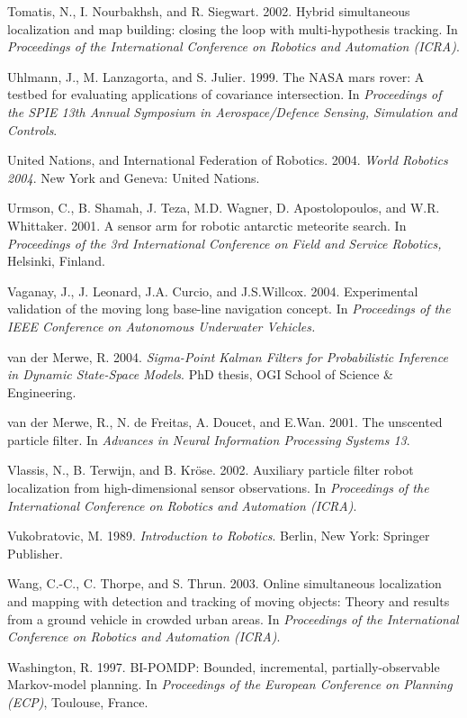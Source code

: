 \documentclass[10pt,a4paper]{article}
\begin{document}
Tomatis, N., I. Nourbakhsh, and R. Siegwart. 2002. Hybrid simultaneous localization
and map building: closing the loop with multi-hypothesis tracking. In \textit{Proceedings
of the International Conference on Robotics and Automation (ICRA)}.

Uhlmann, J., M. Lanzagorta, and S. Julier. 1999. The NASA mars rover: A testbed for
evaluating applications of covariance intersection. In \textit{Proceedings of the SPIE 13th
Annual Symposium in Aerospace/Defence Sensing, Simulation and Controls}.

United Nations, and International Federation of Robotics. 2004. \textit{World Robotics 2004}.
New York and Geneva: United Nations.

Urmson, C., B. Shamah, J. Teza, M.D. Wagner, D. Apostolopoulos, and W.R. Whittaker.
2001. A sensor arm for robotic antarctic meteorite search. In \textit{Proceedings of
the 3rd International Conference on Field and Service Robotics,} Helsinki, Finland.

Vaganay, J., J. Leonard, J.A. Curcio, and J.S.Willcox. 2004. Experimental validation of
the moving long base-line navigation concept. In \textit{Proceedings of the IEEE Conference
on Autonomous Underwater Vehicles.}

van der Merwe, R. 2004. \textit{Sigma-Point Kalman Filters for Probabilistic Inference in Dynamic
State-Space Models}. PhD thesis, OGI School of Science \& Engineering.

van der Merwe, R., N. de Freitas, A. Doucet, and E.Wan. 2001. The unscented particle
filter. In \textit{Advances in Neural Information Processing Systems 13}.

Vlassis, N., B. Terwijn, and B. Kröse. 2002. Auxiliary particle filter robot localization
from high-dimensional sensor observations. In \textit{Proceedings of the International
Conference on Robotics and Automation (ICRA)}.

Vukobratovic, M. 1989. \textit{Introduction to Robotics}. Berlin, New York: Springer Publisher.

Wang, C.-C., C. Thorpe, and S. Thrun. 2003. Online simultaneous localization and
mapping with detection and tracking of moving objects: Theory and results from a
ground vehicle in crowded urban areas. In \textit{Proceedings of the International Conference
on Robotics and Automation (ICRA)}.

Washington, R. 1997. BI-POMDP: Bounded, incremental, partially-observable
Markov-model planning. In \textit{Proceedings of the European Conference on Planning
(ECP)}, Toulouse, France.
\end{document}
